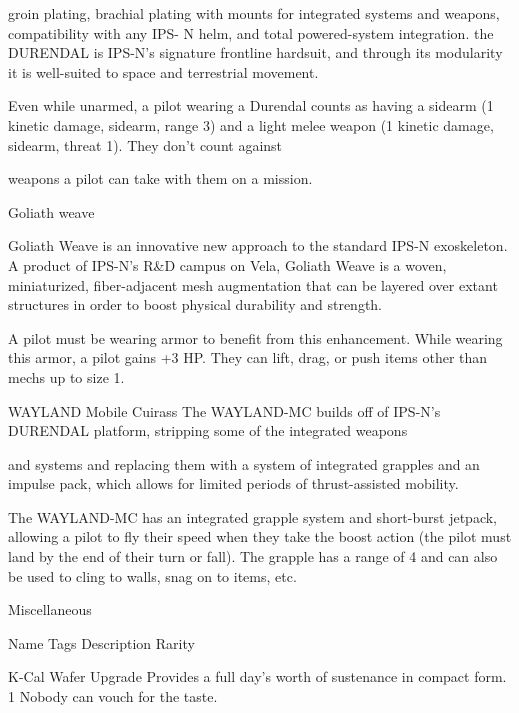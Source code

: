                                                                                                                        


groin plating, brachial plating with mounts for integrated systems and weapons, compatibility with any IPS- 
N helm, and total powered-system integration. the DURENDAL is IPS-N’s signature frontline hardsuit, and  
through its modularity it is well-suited to space and terrestrial movement.        

Even while unarmed, a pilot wearing a Durendal counts as having a sidearm (1 kinetic damage, sidearm,  
range 3) and a light melee weapon (1 kinetic damage, sidearm, threat 1). They don’t count against  

weapons a pilot can take with them on a mission.
 

Goliath weave  

Goliath Weave is an innovative new approach to the standard IPS-N exoskeleton. A product of IPS-N’s R\&D  
campus on Vela, Goliath Weave is a woven, miniaturized, fiber-adjacent mesh augmentation that can be  
layered over extant structures in order to boost physical durability and strength.  

A pilot must be wearing armor to benefit from this enhancement. While wearing this armor, a pilot gains +3  
HP. They can lift, drag, or push items other than mechs up to size 1.
 

WAYLAND Mobile Cuirass  
The WAYLAND-MC builds off of IPS-N’s DURENDAL platform, stripping some of the integrated weapons  

and systems and replacing them with a system of integrated grapples and an impulse pack, which allows  
for limited periods of thrust-assisted mobility.   

The WAYLAND-MC has an integrated grapple system and short-burst jetpack, allowing a pilot to fly their  
speed when they take the boost action (the pilot must land by the end of their turn or fall). The grapple has  
a range of 4 and can also be used to cling to walls, snag on to items, etc.
 

                                                      Miscellaneous 

  Name                          Tags         Description                                                            Rarity 

  K-Cal Wafer                   Upgrade      Provides a full day’s worth of sustenance in compact form.             1 
                                             Nobody can vouch for the taste. 

